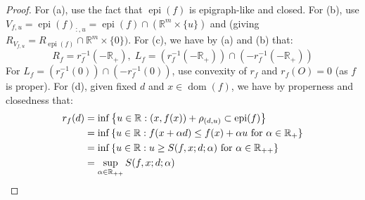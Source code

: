 \begin{proof}
	For (a), use the fact that $\operatorname{epi}(f)$ is epigraph-like and closed.	For (b), use $V_{f,u}=\operatorname{epi}(f)_{:,u}=\operatorname{epi}(f)\cap \left(\mathbb{R}^m\times \{u\}\right)$ and  (giving $R_{V_{f,u}}=R_{\operatorname{epi}(f)}\cap \mathbb{R}^m\times\{0\})$. For (c), we have by (a) and (b) that:
		\[
			R_f=r_f^{-1}\left(-\mathbb{R}_{+}\right),\;
			L_f=\left(r_f^{-1}\left(-\mathbb{R}_{+}\right)\right)\cap\left(-r_f^{-1}(-\mathbb{R}_{+})\right)
		\]
		For $L_f=\left(r_f^{-1}(0)\right)\cap\left(-r_f^{-1}(0)\right)$, use convexity of $r_f$ and $r_f(O)=0$ (as $f$ is proper). For (d), given fixed $d$ and $x\in \operatorname{dom}(f)$, we have by properness and closedness that:
	\begin{align*}
		r_f(d) & =\inf \left\{u\in \mathbb{R}:(x,f(x))+\rho_{(d,u)}\subset \operatorname{epi}(f)\right\}                  \\
		       & = \inf \left\{u\in \mathbb{R}:f(x+\alpha d)\leq f(x)+\alpha u\text{ for }\alpha \in \mathbb{R}_+\right\} \\
		       & = \inf \left\{u\in \mathbb{R}:u\geq S(f,x; d; \alpha)\text{ for }\alpha \in \mathbb{R}_{++}\right\}      \\
		       & = \sup_{\alpha \in \mathbb{R}_{++}} S(f,x; d; \alpha)\qedhere{}
	\end{align*}
\end{proof}


